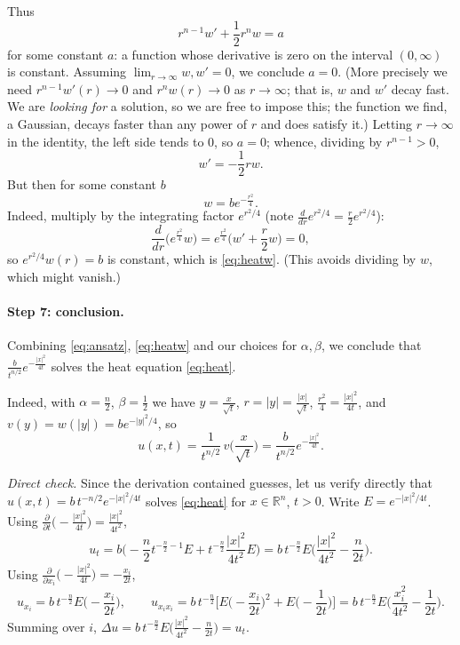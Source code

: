\documentclass[11pt]{article}
\theoremstyle{plain}
\theoremstyle{definition}
\theoremstyle{remark}
\begin{document}
Thus
$$ r^{n-1}w' + \frac12 r^n w = a $$
for some constant $a$: a function whose derivative is zero on the interval $(0,\infty)$ is constant. Assuming $\lim_{r\to\infty} w, w' = 0$, we conclude $a = 0$. (More precisely we need $r^{n-1}w'(r) \to 0$ and $r^n w(r) \to 0$ as $r \to \infty$; that is, $w$ and $w'$ decay fast. We are \emph{looking for} a solution, so we are free to impose this; the function we find, a Gaussian, decays faster than any power of $r$ and does satisfy it.) Letting $r \to \infty$ in the identity, the left side tends to $0$, so $a = 0$; whence, dividing by $r^{n-1} > 0$,
$$ w' = -\frac12 rw. $$
But then for some constant $b$
\begin{equation}\label{eq:heatw}
w = be^{-\frac{r^2}{4}}.
\end{equation}
Indeed, multiply by the integrating factor $e^{r^2/4}$ (note $\frac{d}{dr}e^{r^2/4} = \frac r2 e^{r^2/4}$):
$$ \frac{d}{dr}\Big(e^{\frac{r^2}{4}}w\Big) = e^{\frac{r^2}{4}}\Big(w' + \frac r2 w\Big) = 0, $$
so $e^{r^2/4}w(r) = b$ is constant, which is \eqref{eq:heatw}. (This avoids dividing by $w$, which might vanish.)

\paragraph{Step 7: conclusion.}
Combining \eqref{eq:ansatz}, \eqref{eq:heatw} and our choices for $\alpha, \beta$, we conclude that $\frac{b}{t^{n/2}}e^{-\frac{|x|^2}{4t}}$ solves the heat equation \eqref{eq:heat}.

Indeed, with $\alpha = \frac n2$, $\beta = \frac12$ we have $y = \frac{x}{\sqrt t}$, $r = |y| = \frac{|x|}{\sqrt t}$, $\frac{r^2}{4} = \frac{|x|^2}{4t}$, and $v(y) = w(|y|) = be^{-|y|^2/4}$, so
$$ u(x,t) = \frac{1}{t^{n/2}}\, v\Big(\frac{x}{\sqrt t}\Big) = \frac{b}{t^{n/2}}e^{-\frac{|x|^2}{4t}}. $$

\emph{Direct check.} Since the derivation contained guesses, let us verify directly that $u(x,t) = b\,t^{-n/2}e^{-|x|^2/4t}$ solves \eqref{eq:heat} for $x \in \mathbb{R}^n$, $t > 0$. Write $E = e^{-|x|^2/4t}$. Using $\frac{\partial}{\partial t}\big(-\frac{|x|^2}{4t}\big) = \frac{|x|^2}{4t^2}$,
$$ u_t = b\Big(-\frac n2 t^{-\frac n2 - 1}E + t^{-\frac n2}\frac{|x|^2}{4t^2}E\Big) = b\,t^{-\frac n2}E\Big(\frac{|x|^2}{4t^2} - \frac{n}{2t}\Big). $$
Using $\frac{\partial}{\partial x_i}\big(-\frac{|x|^2}{4t}\big) = -\frac{x_i}{2t}$,
$$ u_{x_i} = b\,t^{-\frac n2}E\Big(-\frac{x_i}{2t}\Big), \qquad u_{x_ix_i} = b\,t^{-\frac n2}\Big[E\Big(-\frac{x_i}{2t}\Big)^2 + E\Big(-\frac{1}{2t}\Big)\Big] = b\,t^{-\frac n2}E\Big(\frac{x_i^2}{4t^2} - \frac{1}{2t}\Big). $$
Summing over $i$, $\Delta u = b\,t^{-\frac n2}E\big(\frac{|x|^2}{4t^2} - \frac{n}{2t}\big) = u_t$. \checkmark
\end{document}
